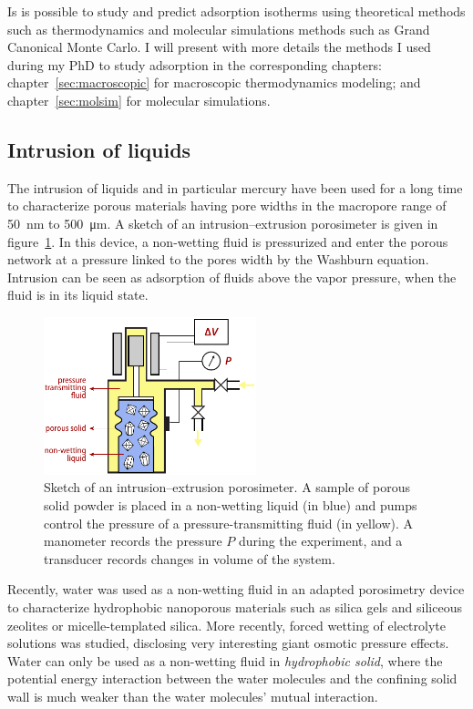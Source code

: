\documentclass[thesis]{subfiles}
\begin{document}
Is is possible to study and predict adsorption isotherms using theoretical
methods such as thermodynamics and molecular simulations methods such as Grand
Canonical Monte Carlo. I will present with more details the methods I used
during my PhD to study adsorption in the corresponding chapters:
chapter~\ref{sec:macroscopic} for macroscopic thermodynamics modeling; and
chapter~\ref{sec:molsim} for molecular simulations.

\subsection{Intrusion of liquids}

The intrusion of liquids and in particular mercury have been used for a long
time to characterize porous materials having pore widths in the macropore range
of \SI{50}{nm} to \SI{500}{\um}\cite{Rouquerol2011}. A sketch of an
intrusion--extrusion porosimeter is given in figure~\ref{fig:porosimeter}. In
this device, a non-wetting fluid is pressurized and enter the porous network at
a pressure linked to the pores width by the Washburn equation. Intrusion can be
seen as adsorption of fluids above the vapor pressure, \ie when the fluid is in
its liquid state.

\begin{figure}[htb]
    \centering
    \includegraphics[width=0.55\textwidth]{figures/images/porosimeter}
    \caption{Sketch of an intrusion--extrusion porosimeter. A sample of porous
    solid powder is placed in a non-wetting liquid (in blue) and pumps control
    the pressure of a pressure-transmitting fluid (in yellow). A manometer
    records the pressure $P$ during the experiment, and a transducer records
    changes in volume of the system.}
  \label{fig:porosimeter}
\end{figure}

Recently, water was used as a non-wetting fluid in an adapted porosimetry
device to characterize hydrophobic nanoporous materials such as silica
gels\cite{Fadeev1997} and siliceous zeolites\cite{Eroshenko2001, Eroshenko2002}
or micelle-templated silica\cite{Lefevre2004}. More recently, forced wetting of
electrolyte solutions was studied, disclosing very interesting giant osmotic
pressure effects\cite{Liu2009, MichelinJamois2015}. Water can only be used as a
non-wetting fluid in \emph{hydrophobic solid}, where the potential energy
interaction between the water molecules and the confining solid wall is much
weaker than the water molecules' mutual interaction.
\end{document}
